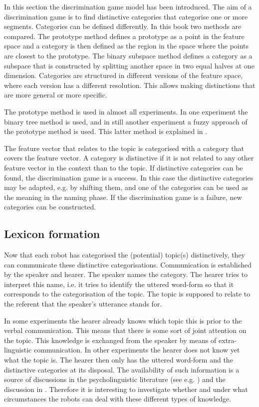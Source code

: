 In this section the discrimination game model has been introduced. The aim of a discrimination game is to find distinctive categories that categorise one or more segments. Categories can be defined differently. In this book two methods are compared. The prototype method defines a prototype as a point in the feature space and a category is then defined as the region in the space where the points are closest to the prototype. The binary subspace method defines a category as a subspace that is constructed by splitting another space in two equal halves at one dimension. Categories are structured in different versions of the feature space, where each version has a different resolution. This allows making distinctions that are more general or more specific. 

The prototype method is used in almost all experiments. In one experiment the binary tree method is used, and in still another experiment a fuzzy approach of the prototype method is used. This latter method is explained in .

The feature vector that relates to the topic is categorised with a category that covers the feature vector. A category is distinctive if it is not related to any other feature vector in the context than to the topic. If distinctive categories can be found, the discrimination game is a success. In this case the distinctive categories may be adapted, e.g. by shifting them, and one of the categories can be used as the meaning in the naming phase. If the discrimination game is a failure, new categories can be constructed.

\subsection{Lexicon formation}\label{s:cm:ng}

Now that each robot has categorised the (potential) topic(s) distinctively, they can communicate these distinctive categorisations. Communication is estab\-lish\-ed by the speaker and hearer. The speaker names the category. The hearer tries to interpret this name, i.e. it tries to identify the uttered word-form so that it corresponds to the categorisation of the topic. The topic is supposed to relate to the referent that the speaker's utterance stands for. 

In some experiments the hearer already knows which topic this is prior to the verbal communication. This means that there is some sort of joint attention on the topic. This knowledge is exchanged from the speaker by means of extra-linguistic communication. In other experiments the hearer does not know yet what the topic is. The hearer then only has the uttered word-form and the distinctive categories at its disposal. The availability of such information is a source of discussions in the psycholinguistic literature (see e.g. \citealt{barrett:1995}) and the discussion in . Therefore it is interesting to investigate whether and under what circumstances the robots can deal with these different types of knowledge.

